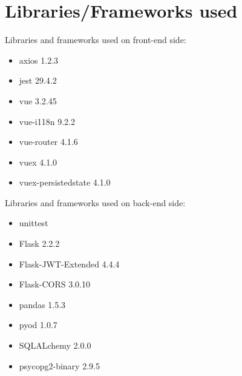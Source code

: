 \section{Libraries/Frameworks used}
Libraries and frameworks used on front-end side:
\begin{itemize}
    \item axios 1.2.3
    \item jest 29.4.2
    \item vue 3.2.45
    \item vue-i118n 9.2.2
    \item vue-router 4.1.6
    \item vuex 4.1.0
    \item vuex-persistedstate 4.1.0
\end{itemize}

Libraries and frameworks used on back-end side:
\begin{itemize}
    \item unittest
    \item Flask 2.2.2
    \item Flask-JWT-Extended 4.4.4
    \item Flask-CORS 3.0.10
    \item pandas 1.5.3
    \item pyod 1.0.7
    \item SQLALchemy 2.0.0
    \item psycopg2-binary 2.9.5
\end{itemize}
\newpage
